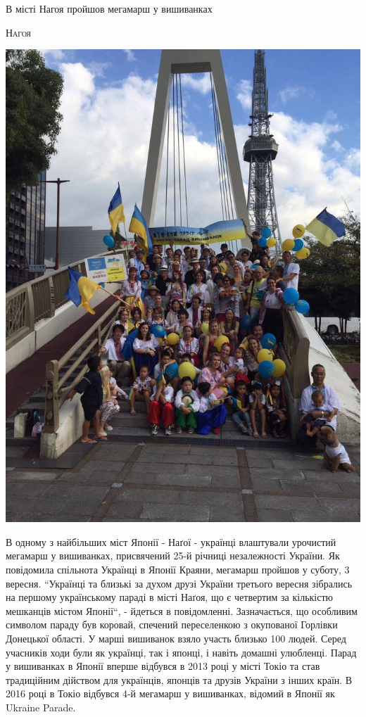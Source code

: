 \documentclass[10pt,a4paper]{article}
\newcommand{\NewsItem}[1]{%
		\usefont{T2A}{iwona}{m}{n} 
		\large #1 \vspace{4pt}
		\par \normalsize \normalfont}
\newcommand{\NewsAuthor}[1]{%
			\hfill \textsc{#1} \vspace{4pt}
			\par \normalfont}
\begin{document}
\begin{multicols}{2}

\NewsItem{В місті Нагоя пройшов мегамарш у вишиванках}
\NewsAuthor{Нагоя}
\begin{center}
\includegraphics[width=0.8\linewidth]{images/16}
\end{center}
В одному з найбільших міст Японії - Наґої - українці влаштували урочистий мегамарш у вишиванках, присвячений 25-й річниці незалежності України. Як повідомила спільнота Українці в Японії Краяни, мегамарш пройшов у суботу, 3 вересня. ``Українці та близькі за духом друзі України третього вересня зібрались на першому українському параді в місті Наґоя, що є четвертим за кількістю мешканців містом Японії``, - йдеться в повідомленні. Зазначається, що особливим символом параду був коровай, спечений переселенкою з окупованої Горлівки Донецької області. У марші вишиванок взяло участь близько 100 людей. Серед учасників ходи були як українці, так і японці, і навіть домашні улюбленці. Парад у вишиванках в Японії вперше відбувся в 2013 році у місті Токіо та став традиційним дійством для українців, японців та друзів України з інших країн. В 2016 році в Токіо відбувся 4-й мегамарш у вишиванках, відомий в Японії як Ukraine Parade.

\vspace{2cm}


\end{multicols}
\end{document}
